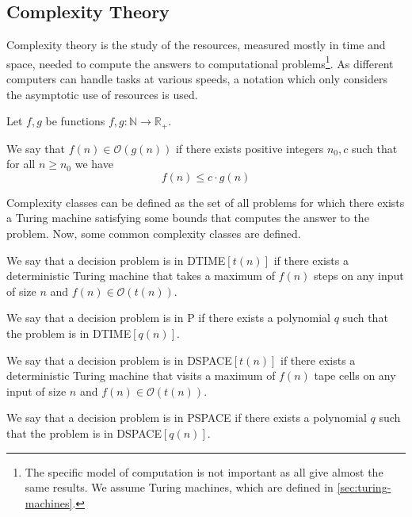 \subsection{Complexity Theory}\label{subsec:complexity-theory}

Complexity theory is the study of the resources, measured mostly in time and space, needed to compute the answers to computational problems\footnote{The specific model of computation is not important as all give almost the same results. We assume Turing machines, which are defined in \cref{sec:turing-machines}.}.
As different computers can handle tasks at various speeds, a notation which only considers the asymptotic use of resources is used.

\begin{define}
    Let $f, g$ be functions $f, g: \mathbb{N} \to \mathbb{R}_+$.

    We say that $f(n) \in \mathcal{O}(g(n))$ if there exists positive integers $n_0, c$ such that for all $n \geq n_0$ we have \[f(n) \leq c\cdot g(n)\]
\end{define}

Complexity classes can be defined as the set of all problems for which there exists a Turing machine satisfying some bounds that computes the answer to the problem.
Now, some common complexity classes are defined.

\begin{define}
    We say that a decision problem is in \acs{DTIME}$[t(n)]$ if there exists a deterministic Turing machine that takes a maximum of $f(n)$ steps on any input of size $n$ and $f(n) \in \mathcal{O}(t(n))$.
\end{define}

\begin{define}[\acs{P}]
    We say that a decision problem is in \acs{P} if there exists a polynomial $q$ such that the problem is in \acs{DTIME}$[q(n)]$.
\end{define}

\begin{define}
    We say that a decision problem is in \acs{DSPACE}$[t(n)]$ if there exists a deterministic Turing machine that visits a maximum of $f(n)$ tape cells on any input of size $n$ and $f(n) \in \mathcal{O}(t(n))$.
\end{define}

\begin{define}
    We say that a decision problem is in \acs{PSPACE} if there exists a polynomial $q$ such that the problem is in \acs{DSPACE}$[q(n)]$.
\end{define}

